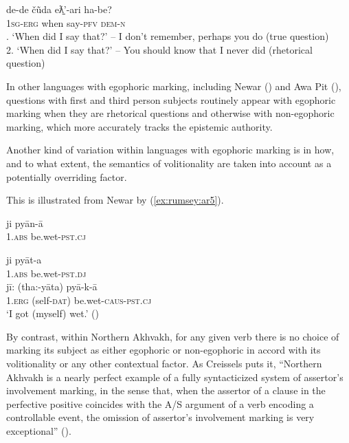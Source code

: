 \documentclass[output=paper]{langsci/langscibook}
\begin{document}
\begin{exe}
	\ex \label{ex:rumsey:ar4}
	\gll de-de čũda	eƛ̱’-ari	ha-be?\\
	1\textsc{sg}-\textsc{erg}	when say-\textsc{pfv} \textsc{dem}-\textsc{n}\\
	. ‘When did I say that?’ – I don’t remember, perhaps you do (true question)\\
	2. ‘When did I say that?’ – You should know that I never did (rhetorical question) \citep[11]{Creissels2008}
\end{exe}

In other languages with egophoric marking, including Newar (\citealt[249]{HaleWatters1973}) and Awa Pit (\citealt[614--615]{Curnow2002a}), questions with first and third person subjects routinely appear with egophoric marking when they are rhetorical questions and otherwise with non-egophoric marking, which more accurately tracks the epistemic authority.
 
Another kind of variation within languages with egophoric marking is in how, and to what extent, the semantics of volitionality are taken into account as a potentially overriding factor.

This is illustrated from Newar by (\ref{ex:rumsey:ar5}).

\begin{exe}
	\ex \label{ex:rumsey:ar5}
	\begin{xlist}
		\ex \label{ex:rumsey:ar5a}
		\gll *ji pyān-ā\\
		1.\textsc{abs} be.wet-\textsc{pst}.\textsc{cj}\\
		\trans

		\ex \label{ex:rumsey:ar5b}
		\gll ji pyāt-a\\
		1.\textsc{abs} be.wet-\textsc{pst}.\textsc{dj}\\
		
		\ex \label{ex:rumsey:ar5c}
		\gll jī: (tha:-yāta) pyā-k-ā\\
		1.\textsc{erg} (self-\textsc{dat}) be.wet-\textsc{caus}-\textsc{pst}.\textsc{cj}\\
		\trans ‘I got (myself) wet.’ (\citealt[29]{Hargreaves2005})
	\end{xlist}	
\end{exe}

By contrast, within Northern Akhvakh, for any given verb there is no choice of marking its subject as either egophoric or non-egophoric in accord with its volitionality or any other contextual factor.  As Creissels puts it, “Northern Akhvakh is a nearly perfect example of a fully syntacticized system of assertor’s involvement marking, in the sense that, when the assertor of a clause in the perfective positive coincides with the A/S argument of a verb encoding a controllable event, the omission of assertor’s involvement marking is very exceptional” (\citealt[12--13]{Creissels2008}).
\end{document}
